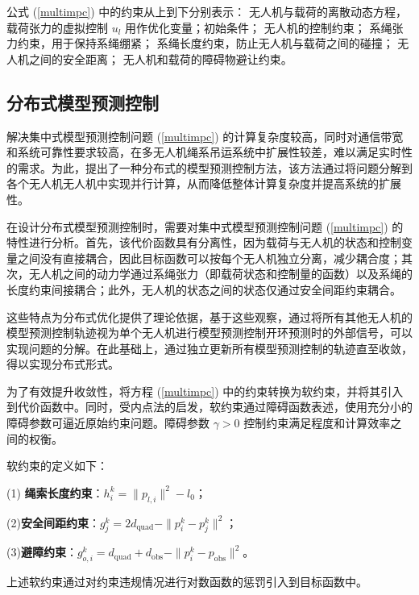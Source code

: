 \documentclass[lang=chs, degree=master, blindreview=false, winfonts=true]{yanputhesis}
\begin{document}
公式 (\ref{multimpc}) 中的约束从上到下分别表示：
无人机与载荷的离散动态方程，载荷张力的虚拟控制 \( u_l \) 用作优化变量；初始条件；
无人机的控制约束；
系绳张力约束，用于保持系绳绷紧；
系绳长度约束，防止无人机与载荷之间的碰撞；
无人机之间的安全距离；
无人机和载荷的障碍物避让约束。

\subsection{分布式模型预测控制}
解决集中式模型预测控制问题 (\ref{multimpc}) 的计算复杂度较高，同时对通信带宽和系统可靠性要求较高，在多无人机绳系吊运系统中扩展性较差，难以满足实时性的需求。为此，提出了一种分布式的模型预测控制方法，该方法通过将问题分解到各个无人机无人机中实现并行计算，从而降低整体计算复杂度并提高系统的扩展性。

在设计分布式模型预测控制时，需要对集中式模型预测控制问题 (\ref{multimpc}) 的特性进行分析。首先，该代价函数具有分离性，因为载荷与无人机的状态和控制变量之间没有直接耦合，因此目标函数可以按每个无人机独立分离，减少耦合度；其次，无人机之间的动力学通过系绳张力（即载荷状态和控制量的函数）以及系绳的长度约束间接耦合；此外，无人机的状态之间的状态仅通过安全间距约束耦合。

这些特点为分布式优化提供了理论依据，基于这些观察，通过将所有其他无人机的模型预测控制轨迹视为单个无人机进行模型预测控制开环预测时的外部信号，可以实现问题的分解。在此基础上，通过独立更新所有模型预测控制的轨迹直至收敛，得以实现分布式形式。

为了有效提升收敛性，将方程 (\ref{multimpc}) 中的约束转换为软约束，并将其引入到代价函数中。同时，受内点法的启发，软约束通过障碍函数表述，使用充分小的障碍参数可逼近原始约束问题。障碍参数 $\gamma > 0$ 控制约束满足程度和计算效率之间的权衡。

软约束的定义如下：

    (1) \textbf{绳索长度约束}：$h_i^k = \|p_{l,i}\|^2 - l_0$；

    (2)\textbf{安全间距约束}：$g_j^k = 2d_{\text{quad}} - \|p_i^k - p_j^k\|^2$；

    (3)\textbf{避障约束}：$g_{o,i}^k = d_{\text{quad}} + d_{\text{obs}} - \|p_i^k - p_{\text{obs}}\|^2$。


上述软约束通过对约束违规情况进行对数函数的惩罚引入到目标函数中。
\end{document}
